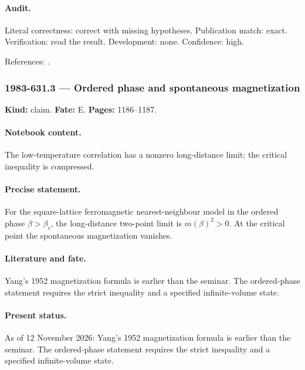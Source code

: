 \paragraph{Audit.} Literal correctness: correct with missing hypotheses. Publication match: exact. Verification: read the result. Development: none. Confidence: high.

\noindent References: \citep{duminilcopintassion2016sharpness}.\par

\subsubsection{1983-631.3 --- Ordered phase and spontaneous magnetization}

\label{item:1983-631.3}

\noindent\textbf{Kind:} claim. \textbf{Fate:} E. \textbf{Pages:} 1186--1187.\par

\paragraph{Notebook content.} The low-temperature correlation has a nonzero long-distance limit; the critical inequality is compressed.

\paragraph{Precise statement.} For the square-lattice ferromagnetic nearest-neighbour model in the ordered phase \(\beta>\beta_c\), the long-distance two-point limit is \(m(\beta)^2>0\). At the critical point the spontaneous magnetization vanishes.

\paragraph{Literature and fate.} Yang's 1952 magnetization formula is earlier than the seminar. The ordered-phase statement requires the strict inequality and a specified infinite-volume state.

\paragraph{Present status.} As of 12 November 2026: Yang's 1952 magnetization formula is earlier than the seminar. The ordered-phase statement requires the strict inequality and a specified infinite-volume state.

